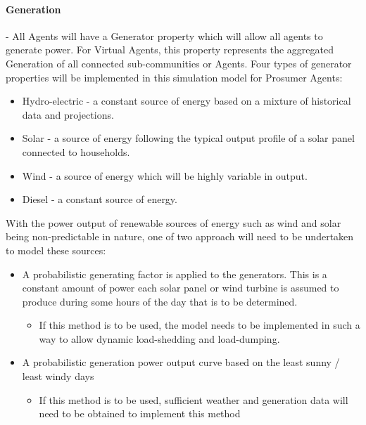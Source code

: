 \paragraph*{Generation} - All Agents will have a Generator property which will allow all agents to generate power. For Virtual Agents, this property represents the aggregated Generation of all connected sub-communities or Agents. Four types of generator properties will be implemented in this simulation model for Prosumer Agents: 

\begin{itemize}
  \item Hydro-electric - a constant source of energy based on a mixture of historical data and projections.
  \item Solar - a source of energy following the typical output profile of a solar panel connected to households.
  \item Wind - a source of energy which will be highly variable in output.
  \item Diesel - a constant source of energy.
\end{itemize}

With the power output of renewable sources of energy such as wind and solar being non-predictable in nature, one of two approach will need to be undertaken to model these sources:
\begin{itemize}
  
  \item A probabilistic generating factor is applied to the generators. This is a constant amount of power each solar panel or wind turbine is assumed to produce during some hours of the day that is to be determined. 
  
  \begin{itemize}
    \item If this method is to be used, the model needs to be implemented in such a way to allow dynamic load-shedding and load-dumping.  
  \end{itemize}
  
  \item A probabilistic generation power output curve based on the least sunny / least windy days
  
  \begin{itemize}
    \item If this method is to be used, sufficient weather and generation data will need to be obtained to implement this method
  \end{itemize}

\end{itemize}


